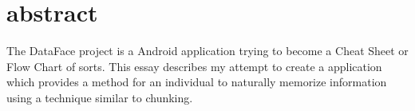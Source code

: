 \documentclass[fontsize=11pt, %
paper=a4, %
twoside, %
captions=tableheading,
index=totoc,
hyperref]{labbook}
\begin{document}
\chapter*{abstract}
\begin{mdframed}[roundcorner=10pt,leftmargin=1, rightmargin=1, 
linecolor=green!40!brown!80,outerlinewidth=.9,
innerleftmargin=8,innertopmargin=8,innerbottommargin=8]
\begin{center}
\begin{minipage}[c]{0.5\textwidth}
The DataFace project is a Android application trying to become a Cheat Sheet or Flow Chart of sorts. This essay describes my attempt to create a application which provides a method for an individual to naturally memorize information using a technique similar to chunking. 
\end{minipage}
\end{center}
\end{mdframed}

\printindex
\tableofcontents %
\newpage %


\pagestyle{scrheadings} %

\end{document}
